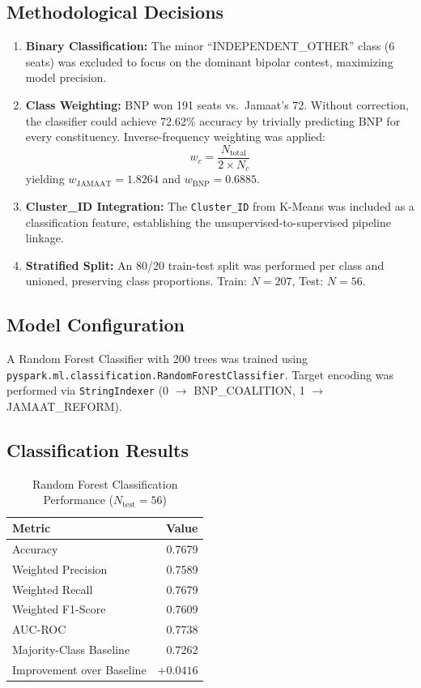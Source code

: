 \documentclass[12pt, a4paper]{article}
\begin{document}
\subsection{Methodological Decisions}

\begin{enumerate}
    \item \textbf{Binary Classification:} The minor ``INDEPENDENT\_OTHER'' class (6 seats) was excluded to focus on the dominant bipolar contest, maximizing model precision.
    \item \textbf{Class Weighting:} BNP won 191 seats vs.\ Jamaat's 72. Without correction, the classifier could achieve 72.62\% accuracy by trivially predicting BNP for every constituency. Inverse-frequency weighting was applied:
    \begin{equation}
        w_c = \frac{N_{\text{total}}}{2 \times N_c}
    \end{equation}
    yielding $w_{\text{JAMAAT}} = 1.8264$ and $w_{\text{BNP}} = 0.6885$.
    \item \textbf{Cluster\_ID Integration:} The \texttt{Cluster\_ID} from K-Means was included as a classification feature, establishing the unsupervised-to-supervised pipeline linkage.
    \item \textbf{Stratified Split:} An 80/20 train-test split was performed per class and unioned, preserving class proportions. Train: $N = 207$, Test: $N = 56$.
\end{enumerate}

\subsection{Model Configuration}
A Random Forest Classifier with 200 trees was trained using \texttt{pyspark.ml.classification.RandomForestClassifier}. Target encoding was performed via \texttt{StringIndexer} (0 $\rightarrow$ BNP\_COALITION, 1 $\rightarrow$ JAMAAT\_REFORM).

\subsection{Classification Results}

\begin{table}[H]
\centering
\caption{Random Forest Classification Performance ($N_{\text{test}} = 56$)}
\label{tab:classification}
\begin{tabular}{l r}
\toprule
\textbf{Metric} & \textbf{Value} \\
\midrule
Accuracy & 0.7679 \\
Weighted Precision & 0.7589 \\
Weighted Recall & 0.7679 \\
Weighted F1-Score & 0.7609 \\
AUC-ROC & 0.7738 \\
Majority-Class Baseline & 0.7262 \\
Improvement over Baseline & $+0.0416$ \\
\bottomrule
\end{tabular}
\end{table}
\end{document}
